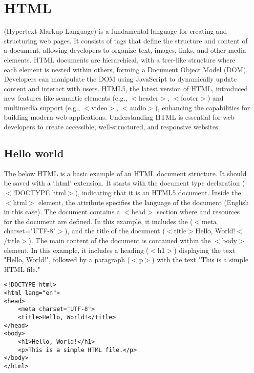 \chapter{HTML}
\thispagestyle{fancy}
\lstset{}\lstset{language=html, style=htmlstyle}

 (Hypertext Markup Language) is a fundamental language for creating and structuring web pages. It consists of tags that define the structure and content of a document, allowing developers to organize text, images, links, and other media elements. HTML documents are hierarchical, with a tree-like structure where each element is nested within others, forming a Document Object Model (DOM). Developers can manipulate the DOM using JavaScript to dynamically update content and interact with users. HTML5, the latest version of HTML, introduced new features like semantic elements (e.g., $<$header$>$, $<$footer$>$) and multimedia support (e.g., $<$video$>$, $<$audio$>$), enhancing the capabilities for building modern web applications. Understanding HTML is essential for web developers to create accessible, well-structured, and responsive websites.

\section{Hello world}

The below HTML is a basic example of an HTML document structure. It should be saved with a `.html' extension. It starts with the document type declaration ($<$!DOCTYPE html$>$), indicating that it is an HTML5 document. Inside the $<$html$>$ element, the  attribute specifies the language of the document (English in this case). The document contains a $<$head$>$ section where  and resources for the document are defined. In this example, it includes the  ($<$meta charset="UTF-8"$>$), and the title of the document ($<$title$>$Hello, World!$<$/title$>$). The main content of the document is contained within the $<$body$>$ element. In this example, it includes a heading ($<$h1$>$) displaying the text "Hello, World!", followed by a paragraph ($<$p$>$) with the text "This is a simple HTML file."

\begin{lstlisting}
<!DOCTYPE html>
<html lang="en">
<head>
    <meta charset="UTF-8">
    <title>Hello, World!</title>
</head>
<body>
    <h1>Hello, World!</h1>
    <p>This is a simple HTML file.</p>
</body>
</html>
\end{lstlisting}

